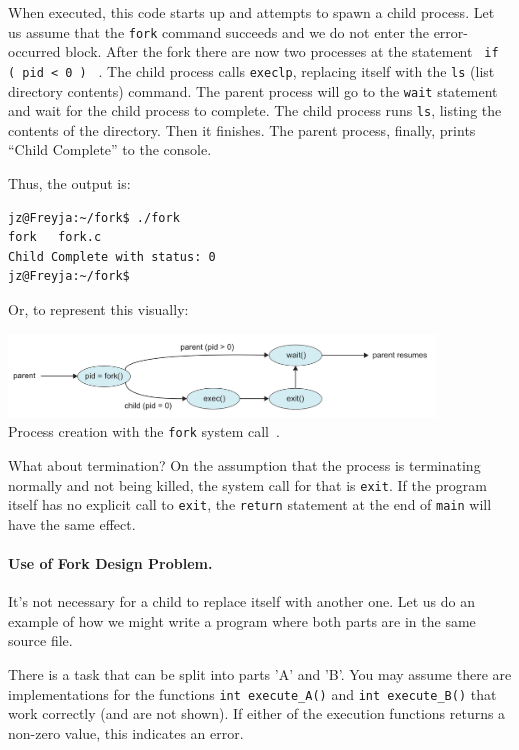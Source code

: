 When executed, this code starts up and attempts to spawn a child process. Let us assume that the \texttt{fork} command succeeds and we do not enter the error-occurred block.  After the fork there are now two processes at the statement \texttt{ if ( pid < 0 ) } . The child process calls \texttt{execlp}, replacing itself with the \texttt{ls} (list directory contents) command. The parent process will go to the \texttt{wait} statement and wait for the child process to complete. The child process runs \texttt{ls}, listing the contents of the directory. Then it finishes. The parent process, finally, prints ``Child Complete'' to the console.

Thus, the output is:
\begin{verbatim}
jz@Freyja:~/fork$ ./fork 
fork   fork.c
Child Complete with status: 0
jz@Freyja:~/fork$ 
\end{verbatim}

Or, to represent this visually:

\begin{center}
\includegraphics[width=0.85\textwidth]{images/fork-syscall.png}\\
Process creation with the \texttt{fork} system call~\cite{osc}.
\end{center}

What about termination? On the assumption that the process is terminating normally and not being killed, the system call for that is \texttt{exit}. If the program itself has no explicit call to \texttt{exit}, the \texttt{return} statement at the end of \texttt{main} will have the same effect.

\paragraph{Use of Fork Design Problem. }
It's not necessary for a child to replace itself with another one. Let us do an example of how we might write a program where both parts are in the same source file.

There is a task that can be split into parts 'A' and 'B'. You may assume there are implementations for the functions \texttt{int execute\_A()} and \texttt{int execute\_B()} that work correctly (and are not shown). If either of the execution functions returns a non-zero value, this indicates an error.

